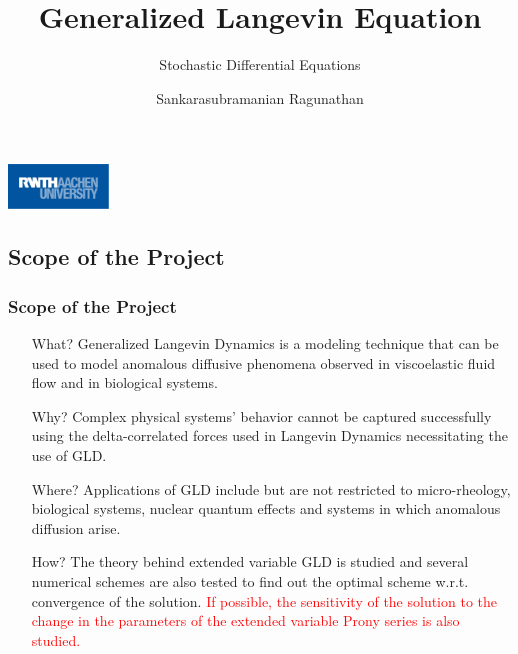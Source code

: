\documentclass[a4paper,8pt]{beamer}
\title{Generalized Langevin Equation}
\subtitle{Stochastic Differential Equations}
\author{Sankarasubramanian Ragunathan \newline \newline 389851}
\institute{\textbf{RWTH Aachen}}
\date{}
\begin{document}
	\begin{frame}
		\titlepage
		\centering
		\includegraphics[width=0.2\textwidth]{RWTH_Aachen_University_Logo.eps}
	\end{frame}

	\begin{frame}
		\tableofcontents
	\end{frame}

	\begin{frame}
		\section{Scope of the Project}
		\frametitle{Scope of the Project}
		
		\begin{itemize}
			\item[What?]{Generalized Langevin Dynamics is a modeling technique that can be used to model anomalous diffusive phenomena observed in viscoelastic fluid flow and in biological systems.}
			
			\item[Why?]{Complex physical systems' behavior cannot be captured successfully using the delta-correlated forces used in Langevin Dynamics necessitating the use of GLD.}
			
			\item[Where?]{Applications of GLD include but are not restricted to micro-rheology, biological systems, nuclear quantum effects and systems in which anomalous diffusion arise.}
			
			\item[How?]{The theory behind extended variable GLD is studied and several numerical schemes are also tested to find out the optimal scheme w.r.t. convergence of the solution. \textcolor{red}{If possible, the sensitivity of the solution to the change in the parameters of the extended variable Prony series is also studied.}}
		\end{itemize}
	\end{frame}
	
\end{document}
